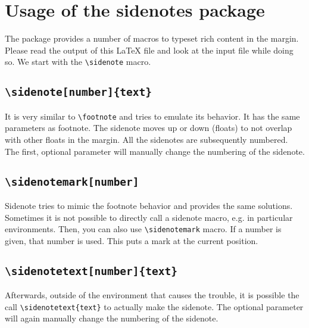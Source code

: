 \documentclass{book}
\begin{document}

%
\chapter{Usage of the \textbf{sidenotes} package}
The package provides a number of macros to typeset rich content in the margin. Please read the output of this \LaTeX{} file and look at the input file while doing so. We start with the \verb+\sidenote+ macro. 

\section{\texttt{\textbackslash sidenote[number]\{text\}}}
It is very similar to \verb+\footnote+ and tries to emulate its behavior. It has the same parameters as footnote. The sidenote moves up or down (floats) to not overlap with other floats in the margin. All the sidenotes are subsequently numbered. The first, optional parameter will manually change the numbering of the sidenote.

\section{\texttt{\textbackslash sidenotemark[number]}}
Sidenote tries to mimic the footnote behavior and provides the same solutions. Sometimes it is not possible to directly call a sidenote macro, e.g. in particular environments. Then, you can also use \verb+\sidenotemark+ macro.\sidenotemark{} If a number is given, that number is used.\sidenotemark[99]{} This puts a mark at the current position. 

\section{\texttt{\textbackslash sidenotetext[number]\{text\}}}
Afterwards, outside of the environment that causes the trouble, it is possible the call \verb+\sidenotetext{text}+ to actually make the sidenote. The optional parameter will again manually change the numbering of the sidenote.
\end{document}
